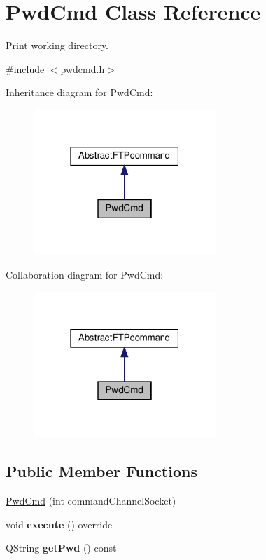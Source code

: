 \hypertarget{classPwdCmd}{}\section{Pwd\+Cmd Class Reference}
\label{classPwdCmd}


Print working directory.  




{\ttfamily \#include $<$pwdcmd.\+h$>$}



Inheritance diagram for Pwd\+Cmd\+:\nopagebreak
\begin{figure}[H]
\begin{center}
\leavevmode
\includegraphics[width=195pt]{d9/d2d/classPwdCmd__inherit__graph}
\end{center}
\end{figure}


Collaboration diagram for Pwd\+Cmd\+:\nopagebreak
\begin{figure}[H]
\begin{center}
\leavevmode
\includegraphics[width=195pt]{d7/d33/classPwdCmd__coll__graph}
\end{center}
\end{figure}
\subsection*{Public Member Functions}
\begin{DoxyCompactItemize}
\item 
\hyperlink{classPwdCmd_a6c80d206530ca06570356473eaca802a}{Pwd\+Cmd} (int command\+Channel\+Socket)
\item 
\mbox{\label{classPwdCmd_a27551622981e356b115869acd019c840}} 
void {\bfseries execute} () override
\item 
\mbox{\label{classPwdCmd_ad8998cc40db3ff83ac73d5809a9903f5}} 
Q\+String {\bfseries get\+Pwd} () const
\end{DoxyCompactItemize}
